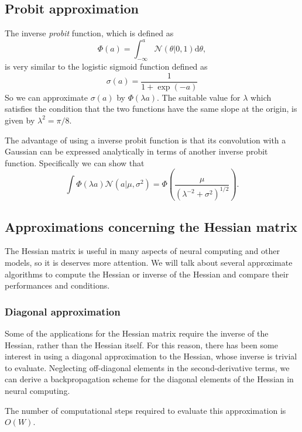 \documentclass[a4paper]{book}
\newcommand{\ud}{\mathrm{d}}
\renewcommand{\cal}{\mathcal}
\newcommand{\imp}[1]{\textit{#1}}
\begin{document}
\subsection{Probit approximation}
The inverse \imp{probit} function, which is defined as
\begin{equation}
	\Phi(a) = \int_{-\infty}^{a} \cal{N}(\theta|0,1) \ud \theta,
\end{equation}
is very similar to the logistic sigmoid function defined as
\begin{equation}
	\sigma(a) =  \frac{1}{1+\exp(-a)}
\end{equation}
So we can approximate $\sigma(a)$ by $\Phi(\lambda a)$. The suitable value for $\lambda$ which satisfies the condition that the two functions have the same slope at the origin, is given by $\lambda ^2 = \pi/8$.

The advantage of using a inverse probit function is that its convolution with a Gaussian can be expressed analytically in terms of another inverse probit function. Specifically we can show that
\begin{equation}
	\int \Phi(\lambda a)\cal{N} (a|\mu,\sigma^2) = \Phi\left(\frac{\mu}{(\lambda^{-2}+\sigma^2)^{1/2}} \right).
\end{equation}
\subsection{Approximations concerning the Hessian matrix}
The Hessian matrix is useful in many aspects of neural computing and other models, so it is deserves more attention. We will talk about several approximate algorithms to compute the Hessian or inverse of the Hessian and compare their performances and conditions.
\subsubsection{Diagonal approximation}
Some of the applications for the Hessian matrix require the inverse of the Hessian, rather than the Hessian itself. For this reason, there has been some interest in using a diagonal approximation to the Hessian, whose inverse is trivial to evaluate. Neglecting off-diagonal elements in the second-derivative terms, we can derive a backpropagation scheme for the diagonal elements of the Hessian in neural computing.

The number of computational steps required to evaluate this approximation is $O(W)$.
\end{document}
